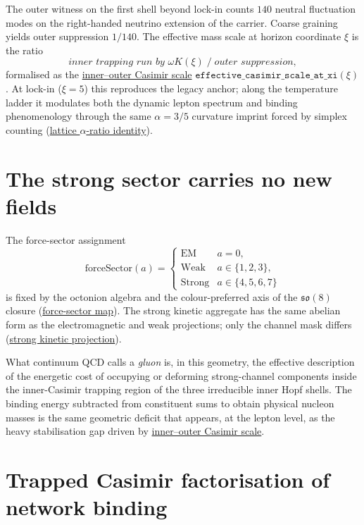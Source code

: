 \documentclass[11pt]{amsart}
\newcommand{\leanterm}[2]{\hyperref[#1]{#2}}
\begin{document}
The outer witness on the first shell beyond lock-in counts $140$ neutral
fluctuation modes on the right-handed neutrino extension of the carrier. Coarse
graining yields outer suppression $1/140$. The effective mass scale at horizon
coordinate $\xi$ is the ratio
\[
\textit{inner trapping run by }\omega K(\xi)\;\big/\;\textit{outer suppression},
\]
formalised as the \leanterm{lean:inner-outer-casimir}{inner--outer Casimir scale}
$\texttt{effective\_casimir\_scale\_at\_xi}(\xi)$. At lock-in ($\xi=5$) this
reproduces the legacy anchor; along the temperature ladder it modulates both the
dynamic lepton spectrum and binding phenomenology through the same
$\alpha=3/5$ curvature imprint forced by simplex counting
(\hyperref[lean:alpha-gamma]{lattice $\alpha$-ratio identity}).

\section{The strong sector carries no new fields}
\label{sec:no-new-fields}

The force-sector assignment
\[
\mathrm{forceSector}(a)=\begin{cases}
\mathrm{EM} & a=0,\\
\mathrm{Weak} & a\in\{1,2,3\},\\
\mathrm{Strong} & a\in\{4,5,6,7\}
\end{cases}
\]
is fixed by the octonion algebra and the colour-preferred axis of the
$\mathfrak{so}(8)$ closure (\hyperref[lean:force-sector]{force-sector map}).
The strong kinetic aggregate has the same abelian form as the electromagnetic and
weak projections; only the channel mask differs
(\hyperref[lean:strong-kinetic]{strong kinetic projection}).

What continuum QCD calls a \emph{gluon} is, in this geometry, the effective
description of the energetic cost of occupying or deforming strong-channel
components inside the inner-Casimir trapping region of the three irreducible inner
Hopf shells. The binding energy subtracted from constituent sums to obtain physical
nucleon masses is the same geometric deficit that appears, at the lepton level, as
the heavy stabilisation gap driven by
\leanterm{lean:inner-outer-casimir}{inner--outer Casimir scale}.

\section{Trapped Casimir factorisation of network binding}
\label{sec:trapped-casimir}
\end{document}
